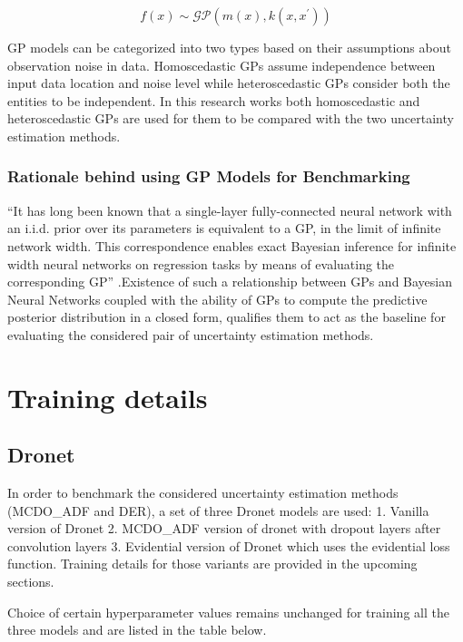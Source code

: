 \begin{equation}
	f(x)  \sim \mathcal{GP}(m(x),k(x, x^\prime))
\end{equation}

GP models can be categorized into two types based on their assumptions about observation noise in data. Homoscedastic GPs assume independence between input data location and noise level while heteroscedastic GPs consider both the entities to be independent. In this research works both homoscedastic and heteroscedastic GPs are used for them to be compared with the two uncertainty estimation methods.
\subsubsection{Rationale behind using GP Models for Benchmarking}
\enquote{It has long been known that a single-layer fully-connected neural network with an i.i.d. prior over its parameters is equivalent to a GP, in the limit of infinite network width. This correspondence enables exact Bayesian inference for infinite width neural networks on regression tasks by means of evaluating the corresponding GP} \cite{lee2018deep}.Existence of such a relationship between GPs and Bayesian Neural Networks coupled with the ability of GPs to compute the predictive posterior distribution in a closed form, qualifies them to act as the baseline for evaluating the considered pair of uncertainty estimation methods.

\section{Training details}
\subsection{Dronet}
In order to benchmark the considered uncertainty estimation methods (MCDO\_ADF and DER), a set of three Dronet models are used: 1. Vanilla version of Dronet 2. MCDO\_ADF version of dronet with dropout layers after convolution layers 3. Evidential version of Dronet which uses the evidential loss function. Training details for those variants are provided in the upcoming sections.

Choice of certain hyperparameter values remains unchanged for training all the three models and are listed in the table below.

